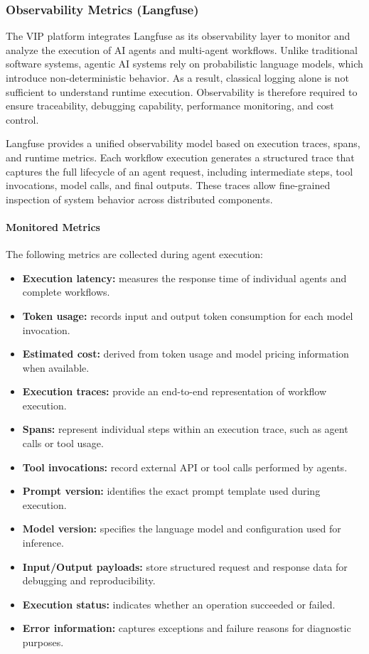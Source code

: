 \subsubsection{Observability Metrics (Langfuse)}

The VIP platform integrates Langfuse as its observability layer to monitor and analyze the execution of AI agents and multi-agent workflows. Unlike traditional software systems, agentic AI systems rely on probabilistic language models, which introduce non-deterministic behavior. As a result, classical logging alone is not sufficient to understand runtime execution. Observability is therefore required to ensure traceability, debugging capability, performance monitoring, and cost control.

Langfuse provides a unified observability model based on execution traces, spans, and runtime metrics. Each workflow execution generates a structured trace that captures the full lifecycle of an agent request, including intermediate steps, tool invocations, model calls, and final outputs. These traces allow fine-grained inspection of system behavior across distributed components.

\paragraph{Monitored Metrics}

The following metrics are collected during agent execution:

\begin{itemize}
    \item \textbf{Execution latency:} measures the response time of individual agents and complete workflows.
    \item \textbf{Token usage:} records input and output token consumption for each model invocation.
    \item \textbf{Estimated cost:} derived from token usage and model pricing information when available.
    \item \textbf{Execution traces:} provide an end-to-end representation of workflow execution.
    \item \textbf{Spans:} represent individual steps within an execution trace, such as agent calls or tool usage.
    \item \textbf{Tool invocations:} record external API or tool calls performed by agents.
    \item \textbf{Prompt version:} identifies the exact prompt template used during execution.
    \item \textbf{Model version:} specifies the language model and configuration used for inference.
    \item \textbf{Input/Output payloads:} store structured request and response data for debugging and reproducibility.
    \item \textbf{Execution status:} indicates whether an operation succeeded or failed.
    \item \textbf{Error information:} captures exceptions and failure reasons for diagnostic purposes.
\end{itemize}

